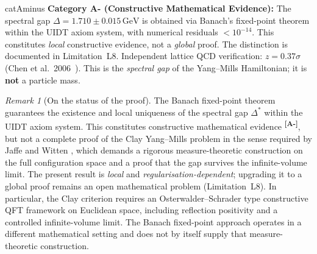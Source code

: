 \documentclass[12pt,a4paper,twoside]{article}
\theoremstyle{plain}
\theoremstyle{definition}
\theoremstyle{remark}
\newtheorem{remark}[theorem]{Remark}
\newcommand{\GeV}{\,\mathrm{GeV}}
\newcommand{\catmark}[1]{\textsuperscript{\textsf{\textbf{[#1]}}}}
\newcommand{\DeltaGap}{1.710 \pm 0.015\GeV}        %
\begin{document}
\begin{evidencebox}{catAminus}
\textbf{Category A- (Constructive Mathematical Evidence):}
The spectral gap $\Delta = \DeltaGap$ is obtained via Banach's
fixed-point theorem within the UIDT axiom system, with numerical residuals
$< 10^{-14}$. This constitutes \emph{local} constructive evidence, not a
\emph{global} proof. The distinction is documented in Limitation~L8.
Independent lattice QCD verification: $z = 0.37\sigma$ (Chen et al.\
2006~\cite{Chen2006}). This is the \emph{spectral gap} of the Yang--Mills
Hamiltonian; it is \textbf{not} a particle mass.
\end{evidencebox}
\vspace{0.6em}
\begin{remark}[On the status of the proof]
\label{rem:banach-status}
The Banach fixed-point theorem guarantees the existence and local uniqueness
of the spectral gap $\Delta^*$ within the UIDT axiom system. This constitutes
constructive mathematical evidence \catmark{A-}, but not a complete proof of
the Clay Yang--Mills problem in the sense required by Jaffe and Witten
\cite{Jaffe2000}, which demands a rigorous measure-theoretic construction
on the full configuration space and a proof that the gap survives the
infinite-volume limit. The present result is \emph{local} and
\emph{regularisation-dependent}; upgrading it to a global proof remains an
open mathematical problem (Limitation~L8). In particular, the Clay criterion
requires an Osterwalder--Schrader type constructive QFT framework on Euclidean
space, including reflection positivity and a controlled infinite-volume limit.
The Banach fixed-point approach operates in a different mathematical setting
and does not by itself supply that measure-theoretic construction.
\end{remark}
\end{document}
